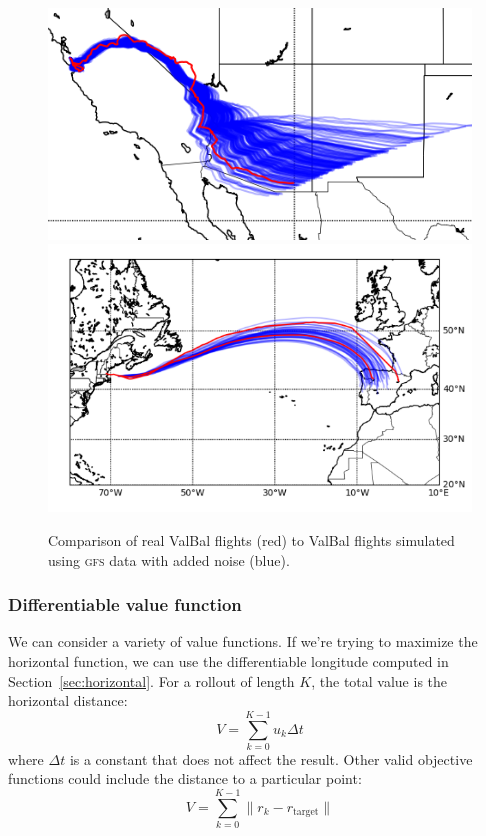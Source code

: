 \documentclass[11pt]{scrartcl} %
\begin{document}
\begin{figure}[h]
\includegraphics[width=0.45\linewidth]{winds.png}
\includegraphics[width=0.45\linewidth]{spain.png}
\caption{Comparison of real ValBal flights (red) to ValBal flights simulated using \textsc{gfs} data with added noise (blue).}
\label{winds}
\end{figure}

\subsubsection{Differentiable value function}
We can consider a variety of value functions. If we're trying to maximize the horizontal function, we can use the differentiable longitude computed in Section~\ref{sec:horizontal}. For a rollout of length $K$, the total value is the horizontal distance:
\begin{equation}
V = \sum_{k=0}^{K-1} u_k \Delta t\label{eqn:value}
\end{equation}
where $\Delta t$ is a constant that does not affect the result. Other valid objective functions could include the distance to a particular point:
\[V = \sum_{k=0}^{K-1} \lVert r_k - r_\text{target}\rVert\]
\end{document}

